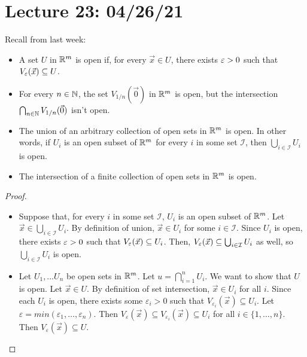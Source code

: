 \section{Lecture 23: 04/26/21}

Recall from last week:
\begin{itemize}
    \item A set $U$ in $\mathbb{R}^m$ is open if, for every $\vec x \in U$, there exists $\varepsilon > 0$ such that $V_\varepsilon (\vec x) \subseteq U$.
    \item For every $n \in \mathbb{N}$, the set $V_{1/n}(\vec 0)$ in $\mathbb{R}^m$ is open, but the intersection $\bigcap_{n \in \mathbb{N}} V_{1/n}(\vec 0)$ isn't open.
\end{itemize}

\begin{proposition}\quad
\begin{itemize}
    \item The union of an arbitrary collection of open sets in $\mathbb{R}^m$ is open. In other words, if $U_i$ is an open subset of $\mathbb{R}^m$ for every $i$ in some set $\mathcal I$, then $\bigcup_{i \in \mathcal I} U_i$ is open.
    \item The intersection of a finite collection of open sets in $\mathbb{R}^m$ is open.
\end{itemize}
\end{proposition}

\begin{proof}\
\begin{itemize}
    \item Suppose that, for every $i$ in some set $\mathcal I$, $U_i$ is an open subset of $\mathbb{R}^m$. Let $\vec x \in \bigcup_{i \in \mathcal I} U_i$. By definition of union, $\vec x \in U_i$ for some $i \in \mathcal I$. Since $U_i$ is open, there exists $\varepsilon > 0$ such that $V_\varepsilon (\vec x) \subseteq U_i$. Then, $V_\varepsilon (\vec x) \subseteq \bigcup_{i \in \mathcal I} U_i$ as well, so $\bigcup_{i \in \mathcal I} U_i$ is open.
    
    \item Let $U_1,\dots U_n$ be open sets in $\mathbb{R}^m$. Let $u=\bigcap^n_{i=1}U_i$. We want to show that $U$ is open. Let $\vec{x}\in U$. By definition of set intersection, $\vec{x}\in U_i$ for all $i$. Since each $U_i$ is open, there exists some $\varepsilon_i > 0$ such that $V_{\varepsilon_i}(\vec{x})\subseteq U_i$. Let $\varepsilon = min(\varepsilon_1,\dots,\varepsilon_n)$. Then $V_\varepsilon(\vec{x}) \subseteq V_{\varepsilon_i}(\vec{x})\subseteq U_i$ for all $i\in \{1,\dots,n\}$. Then $V_\varepsilon(\vec{x})\subseteq U$.  
\end{itemize}
\end{proof}

